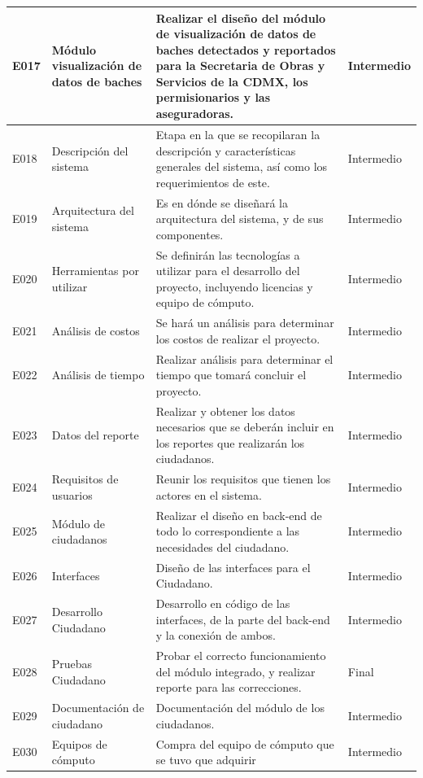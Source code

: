 \documentclass[12pt,twoside]{article}
\begin{document}
\begin{longtable}{|l|m{3cm}|m{6cm}|m{2cm}|}
    E017 & Módulo visualización de datos de baches & Realizar el diseño del módulo de visualización de datos de baches detectados y reportados para la Secretaria de Obras y Servicios de la CDMX, los permisionarios y las aseguradoras. & Intermedio \\ \hline
    E018 & Descripción del sistema & Etapa en la que se recopilaran la descripción y características generales del sistema, así como los requerimientos de este. & Intermedio \\ \hline
    E019 & Arquitectura del sistema & Es en dónde se diseñará la arquitectura del sistema, y de sus componentes. & Intermedio \\ \hline
    E020 & Herramientas por utilizar & Se definirán las tecnologías a utilizar para el desarrollo del proyecto, incluyendo licencias y equipo de cómputo. & Intermedio \\ \hline
    E021 & Análisis de costos & Se hará un análisis para determinar los costos de realizar el proyecto. & Intermedio \\ \hline
    E022 & Análisis de tiempo & Realizar análisis para determinar el tiempo que tomará concluir el proyecto. & Intermedio \\ \hline
    E023 & Datos del reporte & Realizar y obtener los datos necesarios que se deberán incluir en los reportes que realizarán los ciudadanos. & Intermedio \\ \hline
    E024 & Requisitos de usuarios & Reunir los requisitos que tienen los actores en el sistema. & Intermedio \\ \hline
    E025 & Módulo de ciudadanos & Realizar el diseño en back-end de todo lo correspondiente a las necesidades del ciudadano. & Intermedio \\ \hline
    E026 & Interfaces & Diseño de las interfaces para el Ciudadano. & Intermedio \\ \hline
    E027 & Desarrollo Ciudadano & Desarrollo en código de las interfaces, de la parte del back-end y la conexión de ambos. & Intermedio \\ \hline
    E028 & Pruebas Ciudadano & Probar el correcto funcionamiento del módulo integrado, y realizar reporte para las correcciones. & Final \\ \hline
    E029 & Documentación de ciudadano & Documentación del módulo de los ciudadanos. & Intermedio \\ \hline
    E030 & Equipos de cómputo & Compra del equipo de cómputo que se tuvo que adquirir & Intermedio \\ \hline

\end{longtable}
\end{document}
